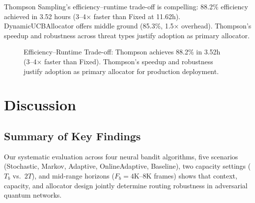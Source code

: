 \documentclass[11pt,a4paper]{article}
\begin{document}
Thompson Sampling's efficiency--runtime trade-off is compelling: 88.2\% efficiency achieved in 3.52 hours (3--4× faster than Fixed at 11.62h). DynamicUCBAllocator offers middle ground (85.3\%, 1.5× overhead). Thompson's speedup and robustness across threat types justify adoption as primary allocator.

\begin{figure}[tb]
\centering
{}
\caption{Efficiency--Runtime Trade-off: Thompson achieves 88.2\% in 3.52h (3--4× faster than Fixed). Thompson's speedup and robustness justify adoption as primary allocator for production deployment.}
\label{fig:runtime_tradeoff}
\end{figure}

\section{Discussion}
\label{sec:discussion}

\subsection{Summary of Key Findings}

Our systematic evaluation across four neural bandit algorithms, five scenarios (Stochastic, Markov, Adaptive, OnlineAdaptive, Baseline), two capacity settings ($T_b$ vs.\ $2T$), and mid-range horizons ($F_b = 4\text{K}–8\text{K}$ frames) shows that context, capacity, and allocator design jointly determine routing robustness in adversarial quantum networks.
\end{document}
